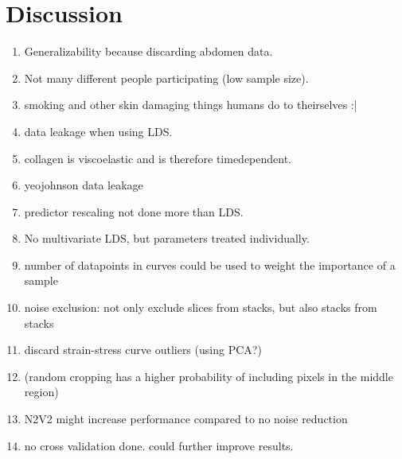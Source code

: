 \chapter{Discussion}

\begin{enumerate}
    \item Generalizability because discarding abdomen data.
    \item Not many different people participating (low sample size).
    \item smoking and other skin damaging things humans do to theirselves :|
    \item data leakage when using LDS.
    \item collagen is viscoelastic and is therefore timedependent.
    \item yeojohnson data leakage
    \item predictor rescaling not done more than LDS.
    \item No multivariate LDS, but parameters treated individually.
    \item number of datapoints in curves could be used to weight the importance of a sample
    \item noise exclusion: not only exclude slices from stacks, but also stacks from stacks
    \item discard strain-stress curve outliers (using PCA?)
    \item (random cropping has a higher probability of including pixels in the middle region)
    \item N2V2 might increase performance compared to no noise reduction
    \item no cross validation done. could further improve results.
\end{enumerate}